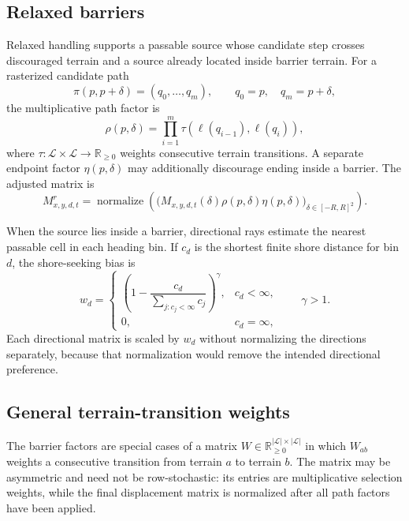 \subsection{Relaxed barriers}
\label{sec:relaxed-reachability}

Relaxed handling supports a passable source whose candidate step crosses discouraged terrain and a source already located inside barrier terrain. For a rasterized candidate path
\begin{equation}
  \pi(p,p+\delta)=(q_0,\ldots,q_m),\qquad q_0=p,\quad q_m=p+\delta,
\end{equation}
the multiplicative path factor is
\begin{equation}
  \rho(p,\delta)=\prod_{i=1}^{m}
    \tau\!\left(\ell(q_{i-1}),\ell(q_i)\right),
\end{equation}
where $\tau:\mathcal{L}\times\mathcal{L}\rightarrow\mathbb{R}_{\ge0}$ weights consecutive terrain transitions. A separate endpoint factor $\eta(p,\delta)$ may additionally discourage ending inside a barrier. The adjusted matrix is
\begin{equation}
  M^r_{x,y,d,t}=\operatorname{normalize}\!\left(
    \bigl(M_{x,y,d,t}(\delta)\rho(p,\delta)\eta(p,\delta)\bigr)_{
      \delta\in[-R,R]^2}
  \right).
\end{equation}

When the source lies inside a barrier, directional rays estimate the nearest passable cell in each heading bin. If $c_d$ is the shortest finite shore distance for bin $d$, the shore-seeking bias is
\begin{equation}
  w_d=
  \begin{cases}
    \left(1-\dfrac{c_d}{\sum_{j:c_j<\infty}c_j}\right)^\gamma,
      & c_d<\infty,\\
    0, & c_d=\infty,
  \end{cases}
  \qquad \gamma>1.
\end{equation}
Each directional matrix is scaled by $w_d$ without normalizing the directions separately, because that normalization would remove the intended directional preference.

\subsection{General terrain-transition weights}

The barrier factors are special cases of a matrix $W\in\mathbb{R}_{\ge0}^{|\mathcal{L}|\times|\mathcal{L}|}$ in which $W_{ab}$ weights a consecutive transition from terrain $a$ to terrain $b$. The matrix may be asymmetric and need not be row-stochastic: its entries are multiplicative selection weights, while the final displacement matrix is normalized after all path factors have been applied.

